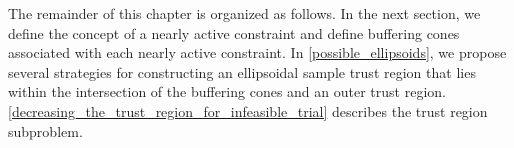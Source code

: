 %




The remainder of this chapter is organized as follows.
In the next section, we define the concept of a nearly active constraint and define buffering cones associated with each nearly active constraint.  
In \cref{possible_ellipsoids}, we propose several strategies for constructing an ellipsoidal sample trust region that lies 
within the intersection of the buffering cones and an outer trust region.
\cref{decreasing_the_trust_region_for_infeasible_trial} describes the trust region subproblem.   



